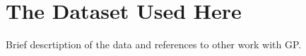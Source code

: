 \section{The Dataset Used Here}
\label{sec:dataset}

Brief descrtiption of the data and references to other work with GP.
